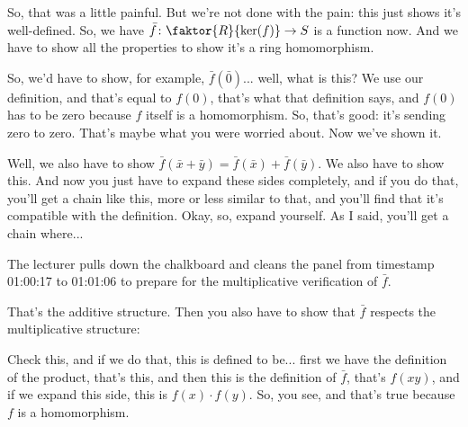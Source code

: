 \begin{proofWrapper}
\begin{speech}[00:58:44 - 01:00:17]
So, that was a little painful. But we're not done with the pain: this just shows it's well-defined. So, we have $\bar{f} \colon \faktor{R}{\ker(f)} \to S$ is a function now.  And we have to show all the properties to show it's a ring homomorphism. 

So, we'd have to show, for example, $\bar{f}(\bar{0})$... well, what is this? We use our definition, and that's equal to $f(0)$, that's what that definition says, and $f(0)$ has to be zero because $f$ itself is a homomorphism.  So, that's good: it's sending zero to zero. That's maybe what you were worried about. Now we've shown it. 

Well, we also have to show $\bar{f}(\bar{x} + \bar{y}) = \bar{f}(\bar{x}) + \bar{f}(\bar{y})$.  We also have to show this. And now you just have to expand these sides completely, and if you do that, you'll get a chain like this, more or less similar to that, and you'll find that it's compatible with the definition. Okay, so, expand yourself.  As I said, you'll get a chain where...
\end{speech}

\begin{note}
The lecturer pulls down the chalkboard and cleans the panel from timestamp 01:00:17 to 01:01:06 to prepare for the multiplicative verification of $\bar{f}$.
\end{note}

\begin{speech}[01:01:06 - 01:01:57]
That's the additive structure. Then you also have to show that $\bar{f}$ respects the multiplicative structure:  

Check this, and if we do that, this is defined to be... first we have the definition of the product, that's this,  and then this is the definition of $\bar{f}$, that's $f(x y)$,  and if we expand this side, this is $f(x) \cdot f(y)$.  So, you see, and that's true because $f$ is a homomorphism.  


\end{speech}
\end{proofWrapper}
